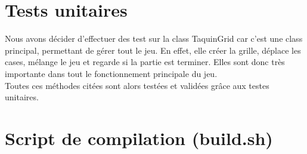	\section{Tests unitaires}
		Nous avons décider d'effectuer des test sur la class TaquinGrid car c'est une class principal, permettant de gérer tout le jeu. En effet, elle créer la grille, déplace les cases, mélange le jeu et regarde si la partie est terminer. Elles sont donc très importante dans tout le fonctionnement principale du jeu.
		\\
		Toutes ces méthodes citées sont alors testées et validées grâce aux testes unitaires.


	\section{Script de compilation (build.sh)}
